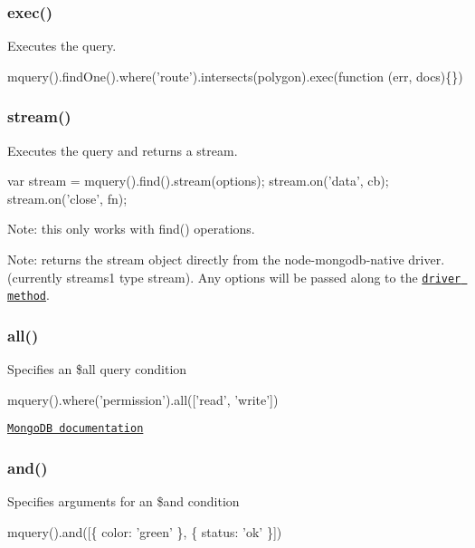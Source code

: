 \subsubsection*{exec()}

Executes the query.


\begin{DoxyCode}
mquery().findOne().where('route').intersects(polygon).exec(function (err, docs)\{\})
\end{DoxyCode}


\subsubsection*{stream()}

Executes the query and returns a stream.


\begin{DoxyCode}
var stream = mquery().find().stream(options);
stream.on('data', cb);
stream.on('close', fn);
\end{DoxyCode}


Note\+: this only works with {\ttfamily find()} operations.

Note\+: returns the stream object directly from the node-\/mongodb-\/native driver. (currently streams1 type stream). Any options will be passed along to the \href{http://mongodb.github.io/node-mongodb-native/api-generated/cursor.html#stream}{\tt driver method}. 



\subsubsection*{all()}

Specifies an {\ttfamily \$all} query condition


\begin{DoxyCode}
mquery().where('permission').all(['read', 'write'])
\end{DoxyCode}


\href{http://docs.mongodb.org/manual/reference/operator/all/}{\tt Mongo\+DB documentation}

\subsubsection*{and()}

Specifies arguments for an {\ttfamily \$and} condition


\begin{DoxyCode}
mquery().and([\{ color: 'green' \}, \{ status: 'ok' \}])
\end{DoxyCode}


